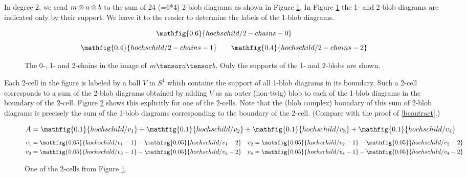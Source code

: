 In degree 2, we send $m\otimes a \otimes b$ to the sum of 24 (=6*4) 2-blob diagrams as shown in
Figure \ref{fig:hochschild-2-chains}. In Figure \ref{fig:hochschild-2-chains} the 1- and 2-blob diagrams are indicated only by their support.
We leave it to the reader to determine the labels of the 1-blob diagrams.
\begin{figure}[!ht]
\begin{equation*}
\mathfig{0.6}{hochschild/2-chains-0}
\end{equation*}
\begin{equation*}
\mathfig{0.4}{hochschild/2-chains-1} \qquad \mathfig{0.4}{hochschild/2-chains-2}
\end{equation*}
\caption{The 0-, 1- and 2-chains in the image of $m \tensor a \tensor b$. Only the supports of the 1- and 2-blobs are shown.}
\label{fig:hochschild-2-chains}
\end{figure}
Each 2-cell in the figure is labeled by a ball $V$ in $S^1$ which contains the support of all
1-blob diagrams in its boundary.
Such a 2-cell corresponds to a sum of the 2-blob diagrams obtained by adding $V$
as an outer (non-twig) blob to each of the 1-blob diagrams in the boundary of the 2-cell.
Figure \ref{fig:hochschild-example-2-cell} shows this explicitly for one of the 2-cells.
Note that the (blob complex) boundary of this sum of 2-blob diagrams is
precisely the sum of the 1-blob diagrams corresponding to the boundary of the 2-cell.
(Compare with the proof of \ref{bcontract}.)

\begin{figure}[!ht]
\begin{equation*}
A = \mathfig{0.1}{hochschild/v_1} + \mathfig{0.1}{hochschild/v_2} + \mathfig{0.1}{hochschild/v_3} + \mathfig{0.1}{hochschild/v_4}
\end{equation*}
\begin{align*}
v_1 & = \mathfig{0.05}{hochschild/v_1-1} -  \mathfig{0.05}{hochschild/v_1-2} &  v_2 & = \mathfig{0.05}{hochschild/v_2-1} -  \mathfig{0.05}{hochschild/v_2-2} \\ 
v_3 & = \mathfig{0.05}{hochschild/v_3-1} -  \mathfig{0.05}{hochschild/v_3-2} &  v_4 & = \mathfig{0.05}{hochschild/v_4-1} -  \mathfig{0.05}{hochschild/v_4-2}
\end{align*}
\caption{One of the 2-cells from Figure \ref{fig:hochschild-2-chains}.}
\label{fig:hochschild-example-2-cell}
\end{figure}
